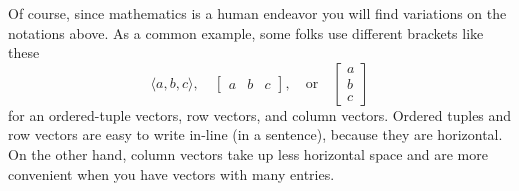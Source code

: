 \documentclass{ximera}
\begin{document}
\begin{concept}
\begin{description}
  \begin{center}
    \colorbox[RGB]{159, 226, 191}{
      \parbox{1cm}{\rule{0pt}{1cm}}}
  \end{center}
\end{description}
\end{concept}

Of course, since mathematics is a human endeavor you will find
variations on the notations above. As a common example, some folks use
different brackets like these
\[
\langle a, b, c\rangle, \quad \begin{bmatrix} a & b & c \end{bmatrix}, \quad \text{or}\quad
\begin{bmatrix}
  a\\
  b\\
  c
\end{bmatrix}
\]
for an ordered-tuple vectors, row vectors, and column vectors. Ordered
tuples and row vectors are easy to write in-line (in a sentence),
because they are horizontal. On the other hand, column vectors take up
less horizontal space and are more convenient when you have vectors
with many entries.
\end{document}

